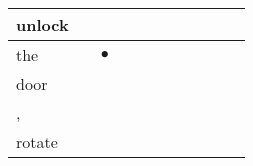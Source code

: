\documentclass[landscape]{article}
\newcommand{\ssp}{\hspace{2pt}}
\newcommand{\mex}{\cellcolor{g}$\bullet$}
\begin{document}
\begin{tabular}{|l|p{10pt}|p{10pt}|p{10pt}|p{10pt}|p{10pt}|p{10pt}|p{10pt}|p{10pt}|p{10pt}|p{10pt}|}
\hline
\ssp unlock \ssp&\hspace{2pt}&\hspace{2pt}&\hspace{2pt}&\hspace{2pt}&\hspace{2pt}&\hspace{2pt}&\hspace{2pt}&\hspace{2pt}&\hspace{2pt}&\hspace{2pt}\\
\hline
\ssp \cellcolor{ref1}the \ssp&\hspace{2pt}&\hspace{2pt}\mex&\hspace{2pt}&\hspace{2pt}&\hspace{2pt}&\hspace{2pt}&\hspace{2pt}&\hspace{2pt}&\hspace{2pt}&\hspace{2pt}\\
\hline
\ssp door \ssp&\hspace{2pt}&\hspace{2pt}&\hspace{2pt}&\hspace{2pt}&\hspace{2pt}&\hspace{2pt}&\hspace{2pt}&\hspace{2pt}&\hspace{2pt}&\hspace{2pt}\\
\hline
\ssp , \ssp&\hspace{2pt}&\hspace{2pt}&\hspace{2pt}&\hspace{2pt}&\hspace{2pt}&\hspace{2pt}&\hspace{2pt}&\hspace{2pt}&\hspace{2pt}&\hspace{2pt}\\
\hline
\ssp rotate \ssp&\hspace{2pt}&\hspace{2pt}&\hspace{2pt}&\hspace{2pt}&\hspace{2pt}&\hspace{2pt}&\hspace{2pt}&\hspace{2pt}&\hspace{2pt}&\hspace{2pt}\\

\end{tabular}
\end{document}
